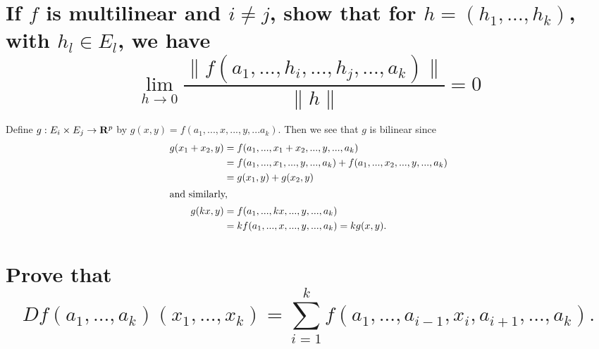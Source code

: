 \begin{parts}
    \part{
        If $f$ is multilinear and $i\ne j$,
        show that for $h=(h_1,...,h_k)$,
        with $h_l\in E_l$, we have
        $$\lim_{h\to 0}{
            \frac{\lVert f(a_1,...,h_i,
            ...,h_j,...,a_k)\rVert}
            {\lVert h \rVert}
        }=0
        $$
    }
    \begin{solution}
        Define $g: E_i\times E_j\to \mathbf{R}^p$
        by $g(x,y)=f(a_1,...,x,...,y,...a_k).$
        Then we see that $g$ is bilinear since
        \begin{align*}
            g(x_1+x_2,y)&=f(a_1,...,
            x_1+x_2,...,y,...,a_k)\\
            &=f(a_1,...,x_1,...,y,...,a_k)+
            f(a_1,...,x_2,...,y,...,a_k)\\
            &=g(x_1,y)+g(x_2,y)\\
            \shortintertext{and similarly,}
            g(kx,y)&=f(a_1,...,
            kx,...,y,...,a_k)\\
            &=kf(a_1,...,x,...,y,...,a_k)
            =kg(x,y).
        \end{align*}
    \end{solution}
    \part{
        Prove that
        $$Df(a_1,...,a_k)(x_1,...,x_k)=
        \sum_{i=1}^k{f(a_1,...,a_{i-1},
        x_i,a_{i+1},...,a_k)}.$$
    }
    \begin{solution}
        
    \end{solution}
\end{parts}